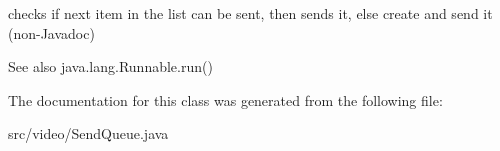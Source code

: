 checks if next item in the list can be sent, then sends it, else create and send it (non-\/Javadoc) \begin{DoxySeeAlso}{See also}
java.lang.Runnable.run() 
\end{DoxySeeAlso}


The documentation for this class was generated from the following file:\begin{DoxyCompactItemize}
\item 
src/video/SendQueue.java\end{DoxyCompactItemize}
